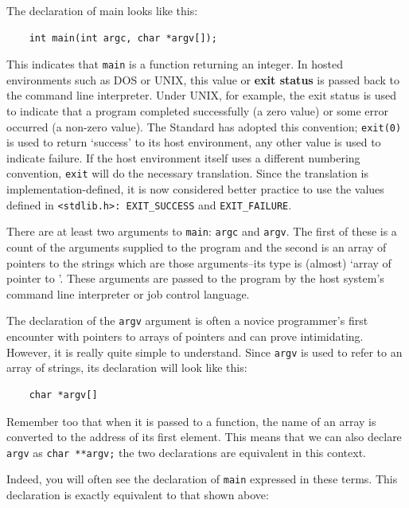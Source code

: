   The declaration of main looks like this:


  \begin{Verbatim}
    int main(int argc, char *argv[]);
  \end{Verbatim}

  This indicates that \texttt{main} is a function returning an
   integer. In hosted environments such as DOS or UNIX, this value or
   \textbf{exit status} is passed back to the command line interpreter. Under
   UNIX, for example, the exit status is used to indicate that a program
   completed successfully (a zero value) or some error occurred (a non-zero
   value). The Standard has adopted this convention; \texttt{exit(0)} is
   used to return `success' to its host environment, any other value is
   used to indicate failure. If the host environment itself uses a different
   numbering convention, \texttt{exit} will do the necessary
   translation. Since the translation is implementation-defined, it is now
   considered better practice to use the values defined in
   \texttt{<stdlib.h>: EXIT\_SUCCESS} and
   \texttt{EXIT\_FAILURE}.


  There are at least two arguments to \texttt{main}:
   \texttt{argc} and \texttt{argv}.  The first of these is a count
   of the arguments supplied to the program and the second is an array of
   pointers to the strings which are those arguments--its type is
   (almost) `array of pointer to \kchar'. These arguments
   are passed to the program by the host system's command line interpreter
   or job control language.


  The declaration of the \texttt{argv} argument is often a novice
   programmer's first encounter with pointers to arrays of pointers and can
   prove intimidating. However, it is really quite simple to understand.
   Since \texttt{argv} is used to refer to an array of strings, its
   declaration will look like this:


  \begin{Verbatim}
    char *argv[]
  \end{Verbatim}

  Remember too that when it is passed to a function, the name of an array
   is converted to the address of its first element. This means that we can
   also declare \texttt{argv} as \texttt{char **argv;} the two
   declarations are equivalent in this context.


  Indeed, you will often see the declaration of \texttt{main}
   expressed in these terms. This declaration is exactly equivalent to that
   shown above:


